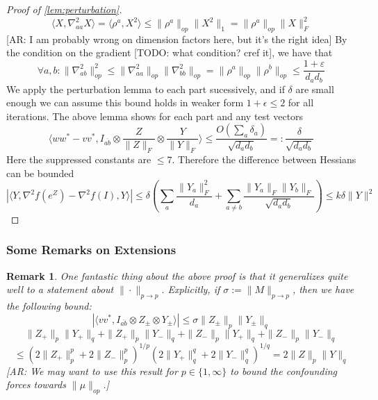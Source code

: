 \documentclass{article}
\newtheorem{remark}{Remark}
\newcommand\eps{\varepsilon}
\newcommand{\AR}[1]{{\color{orange}[AR: #1]}}
\newcommand{\TODO}[1]{{\color{blue}[TODO: #1]}}
\begin{document}
\begin{proof}[Proof of \cref{lem:perturbation}]
\[ \langle X, \nabla_{aa}^{2} X \rangle = \langle \rho^{a}, X^{2} \rangle \leq \|\rho^{a}\|_{op} \|X^{2}\|_{1} = \|\rho^{a}\|_{op} \|X\|_{F}^{2} \]
\AR{I am probably wrong on dimension factors here, but it's the right idea}
By the condition on the gradient \TODO{what condition? cref it}, we have that
\[ \forall a,b: \|\nabla_{ab}^{2}\|_{op}^{2} \leq \|\nabla_{aa}^{2}\|_{op} \|\nabla_{bb}^{2}\|_{op} = \|\rho^{a}\|_{op} \|\rho^{b}\|_{op} \leq \frac{1+\eps}{d_{a} d_{b}}   \]
We apply the perturbation lemma to each part sucessively, and if $\delta$ are small enough we can assume this bound holds in weaker form $1+\epsilon \leq 2$ for all iterations. The above lemma shows for each part and any test vectors
\[ \langle w w^{*} - v v^{*}, I_{\overline{ab}} \otimes \frac{Z}{\|Z\|_{F}} \otimes \frac{Y}{\|Y\|_{F}} \rangle \leq \frac{O( \sum_{a} \delta_{a} )}{\sqrt{d_{a} d_{b}}} =: \frac{\delta}{\sqrt{d_{a} d_{b}}}   \]
Here the suppressed constants are $\leq 7$. Therefore the difference between Hessians can be bounded
\[ |\langle Y, \nabla^{2} f(e^{Z}) - \nabla^{2} f(I), Y \rangle|  \leq \delta \left( \sum_{a} \frac{\|Y_{a}\|_{F}^{2}}{d_{a}} + \sum_{a \neq b} \frac{\|Y_{a}\|_{F} \|Y_{b}\|_{F}}{\sqrt{d_{a} d_{b}}} \right) \leq k \delta \|Y\|^{2}   \]
\end{proof}



\subsubsection{Some Remarks on Extensions}

\begin{remark}
One fantastic thing about the above proof is that it generalizes quite well to a statement about $\|\cdot\|_{p \to p}$. Explicitly, if $\sigma := \|M\|_{p \to p}$, then we have the following bound:
\[ |\langle v v^{*}, I_{\overline{ab}} \otimes Z_{\pm} \otimes Y_{\pm} \rangle| \leq \sigma \|Z_{\pm} \|_{p} \|Y_{\pm} \|_{q}    \]
\[ \|Z_{+}\|_{p} \|Y_{+}\|_{q} + \|Z_{+}\|_{p} \|Y_{-}\|_{q} + \|Z_{-}\|_{p} \|Y_{+}\|_{q} + \|Z_{-}\|_{p} \|Y_{-}\|_{q} \]
\[ \leq (2 \|Z_{+}\|_{p}^{p} + 2 \|Z_{-}\|_{p}^{p})^{1/p} (2 \|Y_{+}\|_{q}^{q} + 2 \|Y_{-}\|_{q}^{q})^{1/q} = 2 \|Z\|_{p} \|Y\|_{q}    \]
\AR{We may want to use this result for $p \in \{1,\infty\}$ to bound the confounding forces towards $\|\mu\|_{op}$.} 
\end{remark}
\end{document}
